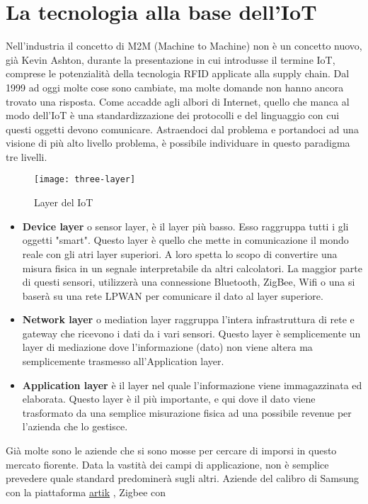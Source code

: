 \section{La tecnologia alla base dell'IoT} 
Nell'industria il concetto di M2M (Machine to Machine) non è un concetto nuovo,
già Kevin Ashton, durante la presentazione in cui introdusse il termine IoT,
comprese le potenzialità della tecnologia RFID applicate alla supply chain. Dal
1999 ad oggi molte cose sono cambiate, ma molte domande non hanno ancora trovato
una risposta. Come accadde agli albori di Internet, quello che manca al modo
dell'IoT è una standardizzazione dei protocolli e del linguaggio con cui questi
oggetti devono comunicare. Astraendoci dal problema e portandoci ad una visione
di più alto livello problema, è possibile individuare in questo paradigma
tre livelli.
\begin{figure}[h]
        \centering 
                \texttt{[image: three-layer]}
        \caption{Layer del IoT}
\end{figure}
\begin{itemize}
\item \textbf{Device layer} o sensor layer, è il layer più basso. Esso raggruppa
tutti i gli oggetti "smart". Questo layer è quello che mette in comunicazione il
mondo reale con gli atri layer superiori. A loro spetta lo scopo di convertire
una misura fisica in un segnale interpretabile da altri calcolatori.
La maggior parte di questi sensori, utilizzerà una connessione Bluetooth,
ZigBee, Wifi o una si baserà su una rete LPWAN per comunicare il dato al layer
superiore.
\item \textbf{Network layer} o mediation layer raggruppa l'intera infrastruttura
di rete e gateway che ricevono i dati da i vari sensori. Questo layer è
semplicemente un layer di mediazione dove l'informazione (dato) non viene altera
ma semplicemente trasmesso all'Application layer.
\item \textbf{Application layer} è il layer nel quale l'informazione viene
immagazzinata ed elaborata. Questo layer è il più importante, e qui dove il dato
viene trasformato da una semplice misurazione fisica ad una possibile revenue
per l'azienda che lo gestisce.
\end{itemize}
Già molte sono le aziende che si sono mosse per cercare di imporsi in questo
mercato fiorente. Data la vastità dei campi di applicazione, non è semplice
prevedere quale standard predominerà sugli altri.
Aziende del calibro di Samsung con la
piattaforma \href{https://www.artik.io}{artik}  , Zigbee con
